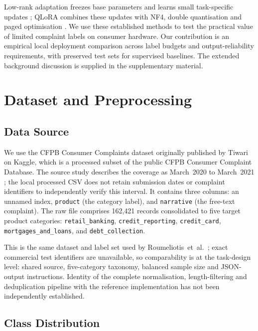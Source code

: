 \documentclass[pdflatex,sn-mathphys-num]{sn-jnl}
\begin{document}
Low-rank adaptation freezes base parameters and learns small task-specific
updates \cite{hu2021lora}; QLoRA combines these updates with NF4,
double quantisation and paged optimisation \cite{dettmers2023qlora}.
We use these established methods to test the practical value of limited
complaint labels on consumer hardware.
Our contribution is an empirical local deployment comparison across
label budgets and output-reliability requirements, with preserved test
sets for supervised baselines.
The extended background discussion is supplied in the supplementary material.


\section{Dataset and Preprocessing}
\label{sec:data}

\subsection{Data Source}

We use the CFPB Consumer Complaints dataset originally published by
Tiwari \cite{tiwari2021cfpb} on Kaggle, which is a processed subset
of the public CFPB Consumer Complaint Database. The source study describes the coverage as March~2020 to March~2021
\cite{roumeliotis2025think}; the local processed CSV does not retain
submission dates or complaint identifiers to independently verify this
interval. It contains
three columns: an unnamed index, \texttt{product} (the category label),
and \texttt{narrative} (the free-text complaint). The raw file
comprises 162,421 records consolidated to five target product categories:
\texttt{retail\_banking}, \texttt{credit\_reporting},
\texttt{credit\_card}, \texttt{mortgages\_and\_loans}, and
\texttt{debt\_collection}.

This is the same dataset and label set used
by Roumeliotis~et~al.\ \cite{roumeliotis2025think}; exact commercial
test identifiers are unavailable, so comparability is at the task-design
level: shared source, five-category taxonomy, balanced sample size and
JSON-output instructions. Identity of the complete normalisation,
length-filtering and deduplication pipeline with the reference
implementation has not been independently established.

\subsection{Class Distribution}
\end{document}
